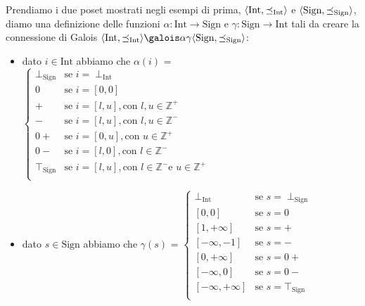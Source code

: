 \begin{example}\label{ex:galoisSignInt}
Prendiamo i due poset mostrati negli esempi di prima, \(\langle \textrm{Int}, \preceq_{\textrm{Int}}\rangle\) e \(\langle \textrm{Sign}, \preceq_{\textrm{Sign}}\rangle\), diamo una definizione delle funzioni \(\alpha:\textrm{Int}\rightarrow\textrm{Sign}\) e \(\gamma:\textrm{Sign}\rightarrow\textrm{Int}\) tali da creare la connessione di Galois \(\GaloisConnection{\textrm{Int}}{\textrm{Sign}}\):
\begin{itemize}
\item dato \(i\in\textrm{Int}\) abbiamo che \(\alpha(i)\) = 
$
\begin{cases}
\perp_{\textrm{Sign}}  & \textrm{se } i=\perp_{\textrm{Int}}\\
0  & \textrm{se } i=[0, 0]\\
+  & \textrm{se } i=[l, u], \textrm{con } l, u \in\mathbb{Z}^+\\
-  & \textrm{se } i=[l, u], \textrm{con } l, u \in\mathbb{Z}^-\\
0+  & \textrm{se } i=[0, u], \textrm{con } u \in\mathbb{Z}^+\\
0-  & \textrm{se } i=[l, 0], \textrm{con } l \in\mathbb{Z}^-\\
\top_{\textrm{Sign}}  & \textrm{se } i=[l, u], \textrm{con } l\in\mathbb{Z}^- \textrm{e } u \in\mathbb{Z}^+\\
\end{cases}
$
\item dato \(s\in\textrm{Sign}\) abbiamo che \(\gamma(s)\) =
$
\begin{cases}
\perp_{\textrm{Int}}  & \textrm{se } s=\perp_{\textrm{Sign}}\\
[0, 0] & \textrm{se } s=0 \\
[1, +\infty] & \textrm{se } s=+\\
[-\infty, -1] & \textrm{se } s=-\\
[0, +\infty] & \textrm{se } s=0+\\
[-\infty, 0] & \textrm{se } s=0-\\
[-\infty, +\infty] & \textrm{se } s=\top_{\textrm{Sign}}\\
\end{cases}
$

\end{itemize}
\end{example}

